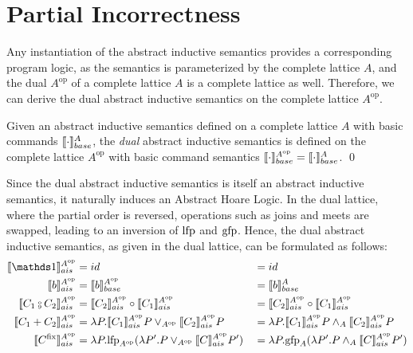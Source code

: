 \documentclass[
  10pt,       %
  twoside,    %
  a4paper,    %
  english,    %
  tikz,       %
  openright,  %
]{book}
\begin{document}
\section{Partial Incorrectness}
\label{chp:partial-incorrectness}

Any instantiation of the abstract inductive semantics provides a corresponding program logic, 
as the semantics is parameterized by the complete lattice
\( A \), and the dual  \( A^{\mathrm{op}} \) of a complete lattice \( A \) is a complete lattice as well. Therefore,
we can derive the dual abstract inductive semantics on the complete lattice
\( A^{\mathrm{op}} \).

\begin{definition}
  Given an abstract inductive semantics defined on a complete lattice \( A \)
  with basic commands \( \llbracket \cdot \rrbracket_{base}^A \), the \emph{dual} abstract inductive
  semantics is defined on the complete lattice \( A^{\mathrm{op}} \) with basic command
  semantics \( \llbracket \cdot \rrbracket_{base}^{A^{\mathrm{op}}} = \llbracket \cdot \rrbracket_{base}^A \). \qed
\end{definition}

Since the dual abstract inductive semantics is itself an abstract inductive
semantics, it naturally induces an Abstract Hoare Logic. In the dual lattice,
where the partial order is reversed, operations such as joins and meets are
swapped, leading to an inversion of \( \mathrm{lfp} \) and \( \mathrm{gfp} \). Hence, the dual
abstract inductive semantics, as given in the dual lattice, can be formulated
as follows:
\begin{align*}
  \asem[A^{\mathrm{op}}]{\sskip}        &= id &&= id \\
  \asem[A^{\mathrm{op}}]{b}             &= \bsem{b}^{A^{\mathrm{op}}} &&= \bsem{b}^A \\
  \asem[A^{\mathrm{op}}]{C_1 \fcmp C_2} &= \asem[A^{\mathrm{op}}]{C_2} \circ \asem[A^{\mathrm{op}}]{C_1} &&= \asem[A^{\mathrm{op}}]{C_2} \circ \asem[A^{\mathrm{op}}]{C_1} \\
  \asem[A^{\mathrm{op}}]{C_1 + C_2}     &= \lambda P . \asem[A^{\mathrm{op}}]{C_1} P \join_{A^{\mathrm{op}}} \asem[A^{\mathrm{op}}]{C_2} P &&= \lambda P . \asem[A^{\mathrm{op}}]{C_1} P \meet_A \asem[A^{\mathrm{op}}]{C_2} P \\
  \asem[A^{\mathrm{op}}]{C^\fix}        &= \lambda P . \lfp_{A^{\mathrm{op}}}(\lambda P'. P \join_{A^{\mathrm{op}}} \asem[A^{\mathrm{op}}]{C} P') &&= \lambda P . \gfp_{A}(\lambda P'. P \meet_A \asem[A^{\mathrm{op}}]{C} P')
\end{align*}
\end{document}
